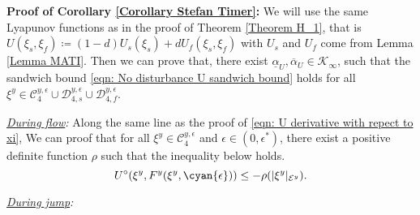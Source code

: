 \newpage
\textbf{Proof of Corollary \ref{Corollary Stefan Timer}:}
We will use the same Lyapunov functions as in the proof of Theorem \ref{Theorem H_1}, that is $U(\xi_s, \xi_f)\coloneqq (1-d) {U_s}(\xi_s) + d{U_f}(\xi_s,\xi_f)$ with $U_s$ and $U_f$ come from Lemma \ref{Lemma MATI}. Then we can prove that, there exist $\underline{\alpha}_U, \overline{\alpha}_U \in \mathcal{K}_{\infty}$, such that the sandwich bound \eqref{eqn: No disturbance U sandwich bound} holds for all $\xi^y \in \mathcal{C}_4^{y,\epsilon} \cup \mathcal{D}_{4,s}^{y,\epsilon} \cup \mathcal{D}_{4,f}^{y,\epsilon} $.



\emph{\underline{During flow}:} Along the same line as the proof of \eqref{eqn: U derivative with repect to xi}, We can proof that for all $\xi^y \in \mathcal{C}_4^{y,\epsilon}$ and $\epsilon \in (0, \epsilon^*)$, there exist a positive definite function $\rho$ such that the inequality below holds.
\begin{equation*}
    U^\circ(\xi^y, F^y(\xi^y, \cyan{\epsilon})) \leq - \rho(|\xi^y|_{\mathcal{E}^y}).
\end{equation*}

\emph{\underline{During jump}:} 



